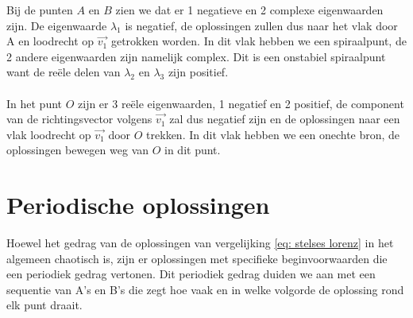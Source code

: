 \documentclass[12pt, a4paper]{article}
\theoremstyle{definition}
\begin{document}
Bij de punten $A$ en $B$ zien we dat er 1 negatieve en 2 complexe eigenwaarden zijn. De eigenwaarde $\lambda_1$ is negatief, de oplossingen zullen dus naar het vlak door A en loodrecht op $\Vec{v_1}$ getrokken worden. In dit vlak hebben we een spiraalpunt, de 2 andere eigenwaarden zijn namelijk complex. Dit is een onstabiel spiraalpunt want de reële delen van $\lambda_2$ en $\lambda_3$ zijn positief.\\
\\
In het punt $O$ zijn er 3 reële eigenwaarden, 1 negatief en 2 positief, de component van de richtingsvector volgens $\Vec{v_1}$ zal dus negatief zijn en de oplossingen naar een vlak loodrecht op $\Vec{v_1}$ door $O$ trekken. In dit vlak hebben we een onechte bron, de oplossingen bewegen weg van $O$ in dit punt.



\section{Periodische oplossingen}
Hoewel het gedrag van de oplossingen van vergelijking \ref{eq: stelses lorenz} in het algemeen chaotisch is, zijn er oplossingen met specifieke beginvoorwaarden die een periodiek gedrag vertonen. Dit periodiek gedrag duiden we aan met een sequentie van A's en B's die zegt hoe vaak en in welke volgorde de oplossing rond elk punt draait.
\end{document}
